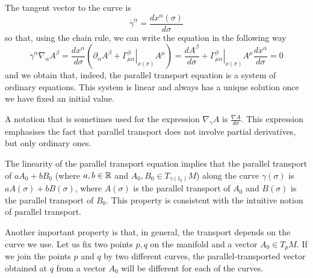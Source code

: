\begin{points}
\item The tangent vector to the curve is
\[
  \dot\gamma^\alpha=\frac{dx^\alpha(\sigma)}{d\sigma}
\]
so that, using the chain rule, we can write the equation in the following way
\[
  \dot\gamma^\alpha\nabla_\alpha A^\beta=\frac{dx^\alpha}{d\sigma}\left(\partial_\alpha A^\beta+\left.\Gamma^\beta_{\mu\alpha}\right|_{x(\sigma)}A^\mu\right)=\frac{dA^\beta}{d\sigma}+\left.\Gamma^\beta_{\mu\alpha}\right|_{x(\sigma)}A^\mu\frac{dx^\alpha}{d\sigma}=0
\]
and we obtain that, indeed, the parallel transport equation is a system of ordinary equations. This system is linear and always has a unique solution once we have fixed an initial value.

\item A notation that is sometimes used for the expression $\nabla_{\dot\gamma}A$ is $\frac{\nabla A}{d\sigma}$. This expression emphasises the fact that parallel transport does not involve partial derivatives, but only ordinary ones.

\item The linearity of the parallel transport equation implies that the parallel transport of $aA_0+bB_0$ (where $a,b\in\mathbb{R}$ and $A_0,B_0\in T_{\gamma(t_0)}M$) along the curve $\gamma(\sigma)$ is $aA(\sigma)+bB(\sigma)$, where $A(\sigma)$ is the parallel transport of $A_0$ and $B(\sigma)$ is the parallel transport of $B_0$. This property is consistent with the intuitive notion of parallel transport.

\item Another important property is that, in general, the transport depends on the curve we use. Let us fix two points $p,q$ on the manifold and a vector $A_0\in T_pM$. If we join the points $p$ and $q$ by two different curves, the parallel-transported vector obtained at $q$ from a vector $A_0$ will be different for each of the curves.


\end{points}
